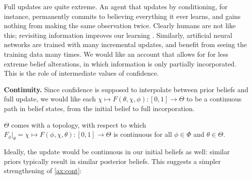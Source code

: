 Full updates are quite extreme.
An agent that updates by conditioning, for instance,
permanently commits to believing everything it ever learns,
and gains nothing from making the same observation twice.
Clearly humans are not like this; revisiting information
 	improves our learning \parencite{ausubel1965effect}.
Similarly, artificial neural networks are trained with
 	many incremental updates, and benefit from seeing 
	the training data many times.
We would like an account that allows for for less extreme belief alterations,
in which information is only partially incorporated.
This is the role of intermediate values of confidence.

\textbf{Continuity.}
Since confidence is supposed to interpolate between prior beliefs and full update,
we would like each $\chi \mapsto F(\theta,\chi,\phi) : [0,1] \to \Theta$
to be a continuous path in belief states, from the initial belief to full incorporation.

\begin{CFaxioms}[nosep]
	\item
	$\Theta$ comes with a topology, with respect to which
	$F_{\phi}|_\theta 
		= \chi \mapsto F(\phi,\chi,\theta)
		: [0,1] \to \Theta$
	is continuous
	for all $\phi \in \Phi$ and $\theta \in \Theta$.
	\label{ax:cont}
\end{CFaxioms}



Ideally, the update would be continuous in our initial
beliefs as well: similar priors typically result
in similar posterior beliefs.
This suggests a simpler strengthening of \cref{ax:cont}:

